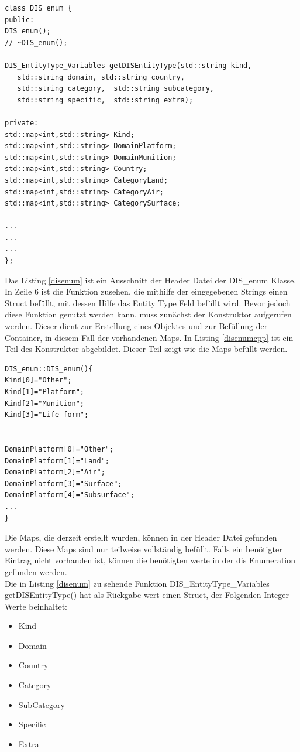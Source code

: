 \begin{lstlisting}[caption = Ausschnitt DIS\_enum.h  ,label= disenum]
class DIS_enum {
public:
DIS_enum();
// ~DIS_enum();

DIS_EntityType_Variables getDISEntityType(std::string kind,
   std::string domain, std::string country,
   std::string category,  std::string subcategory, 
   std::string specific,  std::string extra);

private:
std::map<int,std::string> Kind;
std::map<int,std::string> DomainPlatform;
std::map<int,std::string> DomainMunition;
std::map<int,std::string> Country;
std::map<int,std::string> CategoryLand;
std::map<int,std::string> CategoryAir;
std::map<int,std::string> CategorySurface;

...
...
...
};
\end{lstlisting}
Das Listing \ref{disenum} ist ein Ausschnitt der Header Datei der \glqq DIS\_enum \grqq{} Klasse. In Zeile 6 ist die Funktion zusehen, die mithilfe der eingegebenen Strings einen Struct befüllt, mit dessen Hilfe das   \glqq Entity Type \grqq{} Feld befüllt wird. Bevor jedoch diese Funktion genutzt werden kann, muss zunächst der Konstruktor aufgerufen werden. Dieser dient zur Erstellung eines Objektes und zur Befüllung der Container, in diesem Fall der vorhandenen Maps. In Listing \ref{disenumcpp} ist ein Teil des Konstruktor abgebildet. Dieser Teil zeigt wie die Maps befüllt werden.
 \begin{lstlisting}[caption = Ausschnitt DIS\_enum.cpp  ,label= disenumcpp]
DIS_enum::DIS_enum(){
Kind[0]="Other";
Kind[1]="Platform";
Kind[2]="Munition";
Kind[3]="Life form";
 
 
DomainPlatform[0]="Other";
DomainPlatform[1]="Land";
DomainPlatform[2]="Air";
DomainPlatform[3]="Surface";
DomainPlatform[4]="Subsurface";
...
}
 \end{lstlisting}
 Die Maps, die derzeit erstellt wurden, können in der Header Datei gefunden werden. Diese Maps sind nur teilweise vollständig befüllt. Falls ein benötigter Eintrag nicht vorhanden ist, können die benötigten werte in der \ac{dis} Enumeration gefunden werden. \\ 
 Die in Listing \ref{disenum} zu sehende Funktion \glqq DIS\_EntityType\_Variables getDISEntityType()\grqq{} 
hat als Rückgabe wert einen Struct, der Folgenden Integer Werte beinhaltet: 
\begin{itemize}
	\singlespacing
	\item Kind
	\item Domain
	\item Country
	\item Category
	\item SubCategory
	\item Specific
	\item Extra
\end{itemize}

